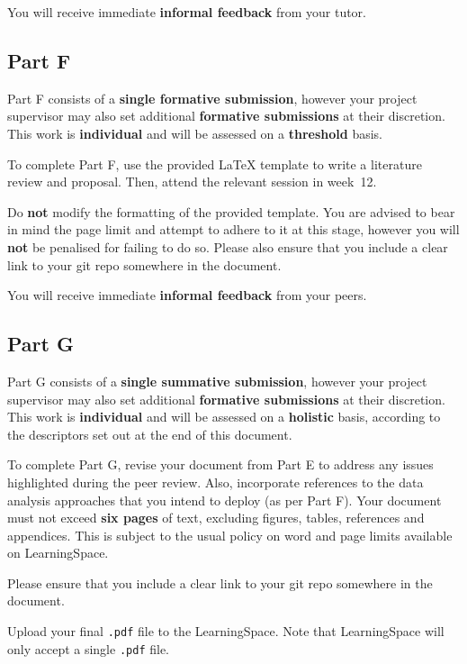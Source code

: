 You will receive immediate \textbf{informal feedback} from your tutor.

\subsection*{Part F}

Part F consists of a \textbf{single formative submission},
however your project supervisor may also set additional \textbf{formative submissions} at their discretion.
This work is \textbf{individual} and will be assessed on a \textbf{threshold} basis.

To complete Part F, use the provided LaTeX template to write a literature review and proposal. Then, attend the 
relevant session in week~12.

Do \textbf{not} modify the formatting of the provided template. You are advised to bear in mind the page limit 
and attempt to adhere to it at this stage, however you will \textbf{not} be penalised for failing to do so. 
Please also ensure that you include a clear link to your git repo somewhere in the document.

You will receive immediate \textbf{informal feedback} from your peers.

\subsection*{Part G}

Part G consists of a \textbf{single summative submission},
however your project supervisor may also set additional \textbf{formative submissions} at their discretion.
This work is \textbf{individual} and will be assessed on a \textbf{holistic} basis,
according to the descriptors set out at the end of this document.

To complete Part G, revise your document from Part E
to address any issues highlighted during the peer review. Also, incorporate references to the data analysis
approaches that you intend to deploy (as per Part F).
Your document must not exceed \textbf{six pages} of text,
excluding figures, tables, references and appendices.
This is subject to the usual policy on word and page limits available on LearningSpace.

Please ensure that you include a clear link to your git repo somewhere in the document.

Upload your final \texttt{.pdf} file to the LearningSpace.
Note that LearningSpace will only accept a single \texttt{.pdf} file.

